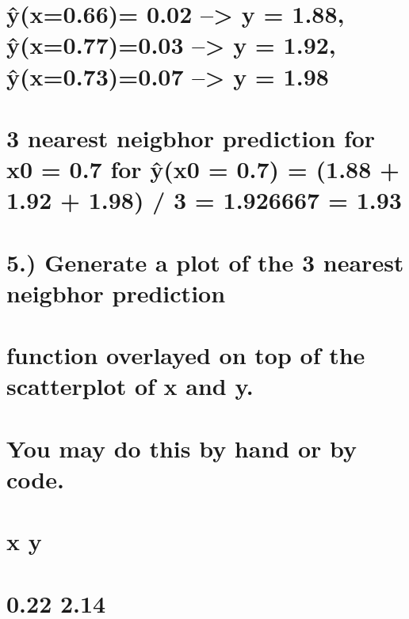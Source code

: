 \documentclass[
  letterpaper,
  DIV=11,
  numbers=noendperiod]{scrreprt}
\begin{document}
{

\chapter{ŷ(x=0.66)= 0.02 --\textgreater{} y = 1.88, ŷ(x=0.77)=0.03
--\textgreater{} y = 1.92, ŷ(x=0.73)=0.07 --\textgreater{} y =
1.98}\label{yx0.66-0.02-y-1.88-yx0.770.03-y-1.92-yx0.730.07-y-1.98}


\chapter{3 nearest neigbhor prediction for x0 = 0.7 for ŷ(x0 = 0.7) =
(1.88 + 1.92 + 1.98) / 3 = 1.926667 =
1.93}\label{nearest-neigbhor-prediction-for-x0-0.7-for-yx0-0.7-1.88-1.92-1.98-3-1.926667-1.93}


\chapter{5.) Generate a plot of the 3 nearest neigbhor
prediction}\label{generate-a-plot-of-the-3-nearest-neigbhor-prediction}


\chapter{function overlayed on top of the scatterplot of x and
y.}\label{function-overlayed-on-top-of-the-scatterplot-of-x-and-y.}


\chapter{You may do this by hand or by
code.}\label{you-may-do-this-by-hand-or-by-code.}


\chapter{x y}\label{x-y-1}


\chapter{0.22 2.14}\label{section-13}

}
\end{document}
